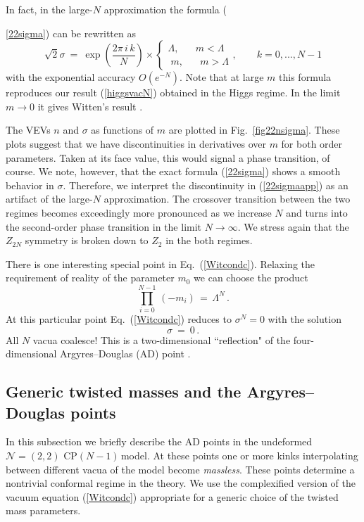 \documentclass[epsfig,12pt]{article}
\def\beq{\begin{equation}}
\def\eeq{\end{equation}}
\newcommand{\cpn}{CP$(N-1)\,$}
\def\beq{\begin{equation}}
\def\eeq{\end{equation}}
\newcommand{\ntwot}{${\mathcal N}= \left(2,2\right) $ }
\begin{document}
In fact, in the large-$N$ approximation the formula ({\ref{22sigma}) can be rewritten as
\beq
\sqrt{2}\sigma ~=~ \exp\left( \frac{2\pi\,i\, k}{N}
\right)\times \left\{
\begin{array}{cc}
\Lambda,\;\;\;\;\;\;m <\Lambda\\[1mm]
\;m,\;\;\;\;\;\; m > \Lambda
\end{array},
\right.
 \qquad k=0, ..., N-1
\label{22sigmaapp}
\eeq
with the exponential accuracy   $O\left(e^{-N}\right)$. Note that at large $m$ this formula reproduces our
result (\ref{higgsvacN}) obtained in the Higgs regime. In the limit $m\to 0$ it gives Witten's
result  \cite{W79}.

The  VEVs $n$ and $\sigma$ as functions of $m$ are plotted in Fig.~\ref{fig22nsigma}.
These plots suggest that we have  discontinuities in derivatives over $m$ for both order
parameters. Taken at its face value, this would signal a phase transition, of course. We note, however, that 
the exact formula
(\ref{22sigma}) shows a smooth behavior in $\sigma$. Therefore, we interpret the discontinuity in
(\ref{22sigmaapp}) as an artifact of the large-$N$ approximation. The crossover transition between 
the two regimes becomes exceedingly more pronounced as we increase 
$N$ and turns into the second-order phase transition in the
limit $N\to\infty$. We stress again that the $Z_{2N}$ symmetry is broken down to $Z_2$ in 
the both regimes.

There is one interesting special point in Eq.~(\ref{Witcondc}).
Relaxing the requirement of reality of the parameter $m_0$ we can choose the 
product\,
\beq
\prod_{i=0}^{N-1}\,(-m_i) \,=\,\Lambda^N\,.
\label{ADpoint}
\eeq
At this particular point 
 Eq.~(\ref{Witcondc}) reduces to $\sigma^N=0$ with the solution
\beq
\sigma ~=~ 0\,.
\label{ADsigma}
\eeq
All $N$ vacua coalesce!  
This is a two-dimensional ``reflection" of the four-dimensional
Argyres--Douglas (AD) point \cite{AD,APSW}.


\subsection{Generic twisted masses and  the Argyres--Douglas points}
\label{genadp}

In this subsection we briefly describe the AD points in the undeformed \ntwot \cpn model.
At these points one or more kinks interpolating between different vacua of the model become
{\em massless}. These points determine a nontrivial conformal regime in the
theory. We use the complexified version of the vacuum equation (\ref{Witcondc})
appropriate for a generic choice of the twisted mass parameters.

}
\end{document}
